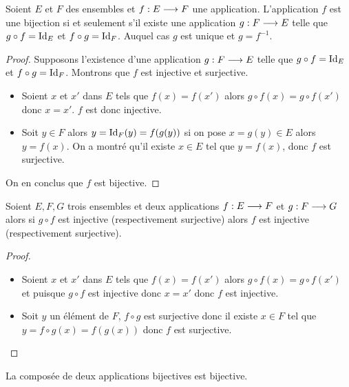 \begin{theo}
    Soient \(E\) et \(F\) des ensembles et \(f:E \longrightarrow F\) une 
    application. L'application \(f\) est une bijection si et seulement s'il 
    existe une application \(g:F \longrightarrow E\) telle que \(g \circ f = 
    \operatorname{Id}_E\) et \(f \circ g = \operatorname{Id}_F\). Auquel cas \(g\) est unique et 
    \(g=f^{-1}\).
\end{theo}

\begin{proof}
    Supposons l'existence d'une application \(g:F \longrightarrow E\) telle que 
    \(g \circ f = \operatorname{Id}_E\) et \(f \circ g = \operatorname{Id}_F\). Montrons que \(f\) est 
    injective et surjective.
    \begin{itemize}
        \item Soient \(x\) et \(x'\) dans \(E\) tels que \(f(x)=f(x')\) alors 
            \(g \circ f(x) = g \circ f(x')\) donc \(x=x'\). \(f\) est donc 
            injective.
        \item Soit \(y \in F\) alors \(y=\operatorname{Id}_F(y)=f(g(y))\) si on pose \(x=g(y) 
            \in E\) alors \(y=f(x)\). On a montré qu'il existe \(x \in E\) tel 
            que \(y=f(x)\), donc \(f\) est surjective.
    \end{itemize}
    On en conclus que \(f\) est bijective.
\end{proof}

\begin{prop}
    Soient \(E,F,G\) trois ensembles et deux applications \(f:E \longrightarrow F\) et 
    \(g:F \longrightarrow G\) alors si \(g \circ f\) est injective (respectivement 
    surjective) alors \(f\) est injective (respectivement surjective).
\end{prop}

\begin{proof}
    \begin{itemize}
        \item Soient \(x\) et \(x'\) dans \(E\) tels que \(f(x)=f(x')\) alors \(g \circ 
            f(x) = g \circ f(x')\) et puisque \(g \circ f\) est injective donc \(x=x'\) 
            donc \(f\) est injective.
        \item Soit \(y\) un élément de \(F\), \(f \circ g\) est surjective donc il 
            existe \(x \in F\) tel que \(y=f \circ g(x)=f(g(x))\) donc \(f\) est 
            surjective.
    \end{itemize}
\end{proof}

\begin{prop}
    La composée de deux applications bijectives est bijective.
\end{prop}

